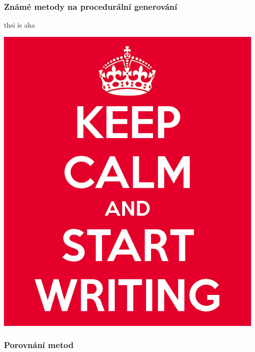 \textcolor{gray}{\blindtext[5]}


\subsubsection{Známé metody na procedurální generování}
\label{metody}
thsi is \cite{Short} aha

\includegraphics[scale=0.3]{obrazky-figures/keep-calm.png}

\textcolor{gray}{\blindtext[10]}


\subsubsection{Porovnání metod}
\textcolor{gray}{\blindtext[8]}

